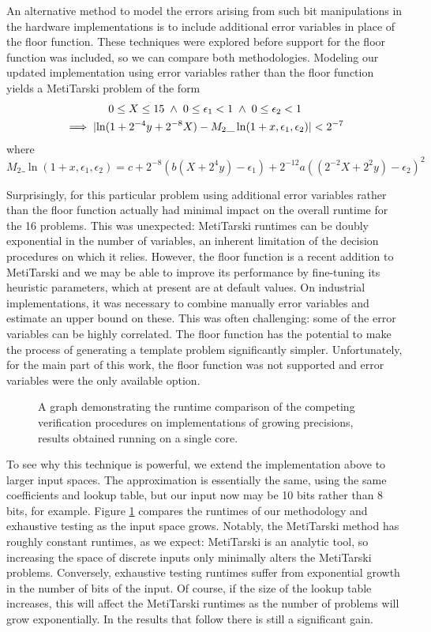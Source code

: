 An alternative method to model the errors arising from such bit manipulations in the hardware implementations is to include additional error variables in place of the floor function. These techniques were explored before support for the floor function was included, so we can compare both methodologies. Modeling our updated implementation using error variables rather than the floor function yields a MetiTarski problem of the form
\begin{gather*}
	0\le X \le 15 \hspace{0.1cm} \land \hspace{0.1cm} 0\le \epsilon_1<1\hspace{0.1cm} \land \hspace{0.1cm} 0\le \epsilon_2<1\\
	\implies \lvert\ln(1+2^{-4}y+2^{-8}X) - M_2\_\ln(1+x,\epsilon_1,\epsilon_2)\rvert < 2^{-7}
\end{gather*}
where
$$M_2\_\ln(1+x,\epsilon_1,\epsilon_2)=c+2^{-8}(b(X+2^{4}y)-\epsilon_1)+2^{-12}a((2^{-2}X+2^{2}y)-\epsilon_2)^2$$

Surprisingly, for this particular problem using additional error variables rather than the floor function actually had minimal impact on the overall runtime for the 16 problems. This was unexpected: MetiTarski runtimes can be doubly exponential in the number of variables, an inherent limitation of the decision procedures on which it relies. However, the floor function is a recent addition to MetiTarski and we may be able to improve its performance by fine-tuning its heuristic parameters, which at present are at default values. On industrial implementations, it was necessary to combine manually error variables and estimate an upper bound on these. This was often challenging: some of the error variables can be highly correlated. The floor function has the potential to make the process of generating a template problem significantly simpler. Unfortunately, for the main part of this work, the floor function was not supported and error variables were the only available option.
\begin{figure}
\centering

\caption{A graph demonstrating the runtime comparison of the competing verification procedures on implementations of growing precisions, results obtained running on a single core. \label{runtime_graph}
}
\end{figure}
To see why this technique is powerful, we extend the implementation above to larger input spaces. The approximation is essentially the same, using the same coefficients and lookup table, but our input now may be 10 bits rather than 8 bits, for example. Figure \ref{runtime_graph} compares the runtimes of our methodology and exhaustive testing as the input space grows. Notably, the MetiTarski method has roughly constant runtimes, as we expect: MetiTarski is an analytic tool, so increasing the space of discrete inputs only minimally alters the MetiTarski problems. Conversely, exhaustive testing runtimes suffer from exponential growth in the number of bits of the input. Of course, if the size of the lookup table increases, this will affect the MetiTarski runtimes as the number of problems will grow exponentially. In the results that follow there is still a significant gain.

